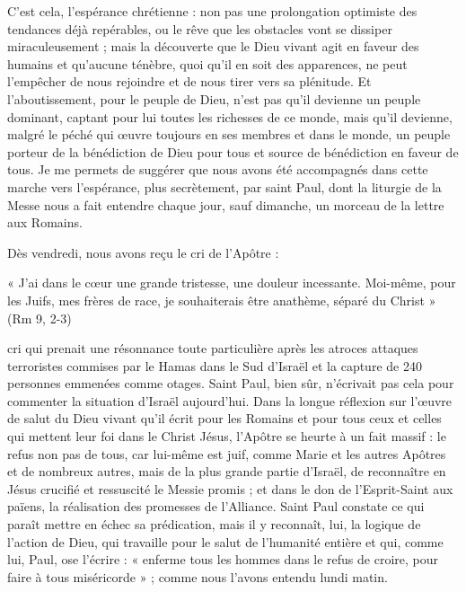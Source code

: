 C’est cela, l’espérance chrétienne : non pas une prolongation optimiste des tendances déjà repérables, ou le rêve que les obstacles vont se dissiper miraculeusement ; mais la découverte que le Dieu vivant agit en faveur des humains et qu’aucune ténèbre, quoi qu’il en soit des apparences, ne peut l’empêcher de nous rejoindre et de nous tirer vers sa plénitude. Et l’aboutissement, pour le peuple de Dieu, n’est pas qu’il devienne un peuple dominant, captant pour lui toutes les richesses de ce monde, mais qu’il devienne, malgré le péché qui œuvre toujours en ses membres et dans le monde, un peuple porteur de la bénédiction de Dieu pour tous et source de bénédiction en faveur de tous.
Je me permets de suggérer que nous avons été accompagnés dans cette marche vers l’espérance, plus secrètement, par saint Paul, dont la liturgie de la Messe nous a fait entendre chaque jour, sauf dimanche, un morceau de la lettre aux Romains.
 
Dès vendredi, nous avons reçu le cri de l’Apôtre : \begin{singlequote}
    « J’ai dans le cœur une grande tristesse, une douleur incessante. Moi-même, pour les Juifs, mes frères de race, je souhaiterais être anathème, séparé du Christ » (Rm 9, 2-3)
\end{singlequote} cri qui prenait une résonnance toute particulière après les atroces attaques terroristes commises par le Hamas dans le Sud d’Israël et la capture de 240 personnes emmenées comme otages. Saint Paul, bien sûr, n’écrivait pas cela pour commenter la situation d’Israël aujourd’hui. Dans la longue réflexion sur l’œuvre de salut du Dieu vivant qu’il écrit pour les Romains et pour tous ceux et celles qui mettent leur foi dans le Christ Jésus, l’Apôtre se heurte à un fait massif : le refus non pas de tous, car lui-même est juif, comme Marie et les autres Apôtres et de nombreux autres, mais de la plus grande partie d’Israël, de reconnaître en Jésus crucifié et ressuscité le Messie promis ; et dans le don de l’Esprit-Saint aux païens, la réalisation des promesses de l’Alliance. Saint Paul constate ce qui paraît mettre en échec sa prédication, mais il y reconnaît, lui, la logique de l’action de Dieu, qui travaille pour le salut de l’humanité entière et qui, comme lui, Paul, ose l’écrire : « enferme tous les hommes dans le refus de croire, pour faire à tous miséricorde » ; comme nous l’avons entendu lundi matin.


